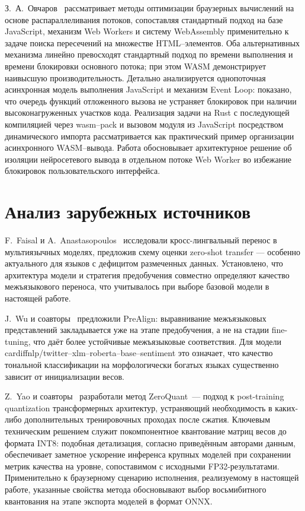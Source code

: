 З.~А.~Овчаров~\cite{Ovcharov2023} рассматривает методы оптимизации браузерных вычислений на основе распараллеливания потоков, сопоставляя стандартный подход на базе JavaScript, механизм Web Workers и систему WebAssembly применительно к задаче поиска пересечений на множестве HTML–элементов. Оба альтернативных механизма линейно превосходят стандартный подход по времени выполнения и времени блокировки основного потока; при этом WASM демонстрирует наивысшую производительность. Детально анализируется однопоточная асинхронная модель выполнения JavaScript и механизм Event Loop: показано, что очередь функций отложенного вызова не устраняет блокировок при наличии высоконагруженных участков кода. Реализация задачи на Rust с последующей компиляцией через wasm–pack и вызовом модуля из JavaScript посредством динамического импорта рассматривается как практический пример организации асинхронного WASM–вывода. Работа обосновывает архитектурное решение об изоляции нейросетевого вывода в отдельном потоке Web Worker во избежание блокировок пользовательского интерфейса.

\section{Анализ зарубежных источников} \label{sec:анализ_зарубежных_источников}

F.~Faisal и A.~Anastasopoulos~\cite{faisal2024crosslingual} исследовали кросс-лингвальный перенос в мультиязычных моделях, предложив схему оценки zero-shot transfer — особенно актуального для языков с дефицитом размеченных данных. Установлено, что архитектура модели и стратегия предобучения совместно определяют качество межъязыкового переноса, что учитывалось при выборе базовой модели в настоящей работе.

J.~Wu и соавторы~\cite{wu2024prealign} предложили PreAlign: выравнивание межъязыковых представлений закладывается уже на этапе предобучения, а не на стадии fine-tuning, что даёт более устойчивые межъязыковые соответствия. Для модели cardiffnlp/twitter--xlm--roberta--base--sentiment это означает, что качество тональной классификации на морфологически богатых языках существенно зависит от инициализации весов.

Z.~Yao и соавторы~\cite{yao2022zeroquant} разработали метод ZeroQuant~— подход к post-training quantization трансформерных архитектур, устраняющий необходимость в каких-либо дополнительных тренировочных проходах после сжатия. Ключевым техническим решением служит покомпонентное квантование матриц весов до формата INT8: подобная детализация, согласно приведённым авторами данным, обеспечивает заметное ускорение инференса крупных моделей при сохранении метрик качества на уровне, сопоставимом с исходными FP32-результатами. Применительно к браузерному сценарию исполнения, реализуемому в настоящей работе, указанные свойства метода обосновывают выбор восьмибитного квантования на этапе экспорта моделей в формат ONNX.
 
